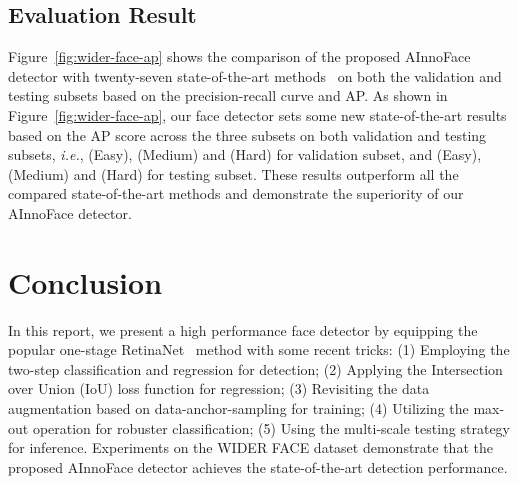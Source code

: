 \documentclass{article} \usepackage{nips13submit_e,times}
\def\ie{{\em i.e.}}
\begin{document}
\subsection{Evaluation Result}
Figure~\ref{fig:wider-face-ap} shows the comparison of the proposed AInnoFace detector with twenty-seven state-of-the-art methods~\cite{DBLP:conf/eccv/CaiFFV16,DBLP:journals/corr/abs-1809-02693,DBLP:conf/cvpr/HuR17,DBLP:journals/corr/abs-1810-10220,DBLP:conf/iccv/NajibiSCD17,DBLP:conf/icpr/Ohn-BarT16a,tang2018pyramidbox,DBLP:journals/corr/abs-1811-08557,DBLP:journals/corr/WangLJW17,wang2017fan,DBLP:journals/corr/abs-1709-05256,DBLP:conf/icb/YangYLL14,DBLP:conf/iccv/YangLLT15,DBLP:conf/cvpr/YangLLT16,DBLP:journals/corr/YangXLT17,DBLP:journals/corr/abs-1802-02142,DBLP:journals/corr/abs-1712-00721,DBLP:journals/spl/ZhangZLQ16,DBLP:conf/iccv/abs-1708-05237,zhu2018seeing,DBLP:journals/corr/ZhuZLS16,DBLP:journals/corr/abs-1901-02350,DBLP:journals/corr/abs-1901-06651,li2019pyramidbox++,zhang2019single} on both the validation and testing subsets based on the precision-recall curve and AP. As shown in Figure~\ref{fig:wider-face-ap}, our face detector sets some new state-of-the-art results based on the AP score across the three subsets on both validation and testing subsets, \ie,  (Easy),  (Medium) and  (Hard) for validation subset, and  (Easy),  (Medium) and  (Hard) for testing subset. These results outperform all the compared state-of-the-art methods and demonstrate the superiority of our AInnoFace detector.


\section{Conclusion}
In this report, we present a high performance face detector by equipping the popular one-stage RetinaNet~\cite{DBLP:conf/iccv/LinPRK17} method with some recent tricks: (1) Employing the two-step classification and regression for detection; (2) Applying the Intersection over Union (IoU) loss function for regression; (3) Revisiting the data augmentation based on data-anchor-sampling for training; (4) Utilizing the max-out operation for robuster classification; (5) Using the multi-scale testing strategy for inference. Experiments on the WIDER FACE dataset demonstrate that the proposed AInnoFace detector achieves the state-of-the-art detection performance.



\end{document}
